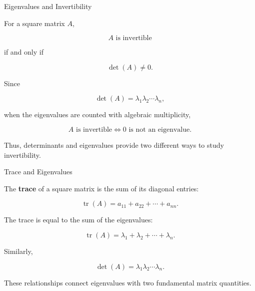 
\begin{frame}{Eigenvalues and Invertibility}

For a square matrix $A$,

\[
A\text{ is invertible}
\]

if and only if

\[
\det(A)\neq0.
\]

Since

\[
\det(A)
=
\lambda_1\lambda_2\cdots\lambda_n,
\]

when the eigenvalues are counted with algebraic
multiplicity,

\[
\boxed{
A\text{ is invertible}
\iff
0\text{ is not an eigenvalue}.
}
\]

Thus, determinants and eigenvalues provide two different
ways to study invertibility.

\end{frame}



\begin{frame}{Trace and Eigenvalues}

The \textbf{trace} of a square matrix is the sum of its
diagonal entries:

\[
\boxed{
\operatorname{tr}(A)
=
a_{11}+a_{22}+\cdots+a_{nn}.
}
\]

The trace is equal to the sum of the eigenvalues:

\[
\boxed{
\operatorname{tr}(A)
=
\lambda_1+\lambda_2+\cdots+\lambda_n.
}
\]

Similarly,

\[
\boxed{
\det(A)
=
\lambda_1\lambda_2\cdots\lambda_n.
}
\]

These relationships connect eigenvalues with two fundamental
matrix quantities.

\end{frame}



